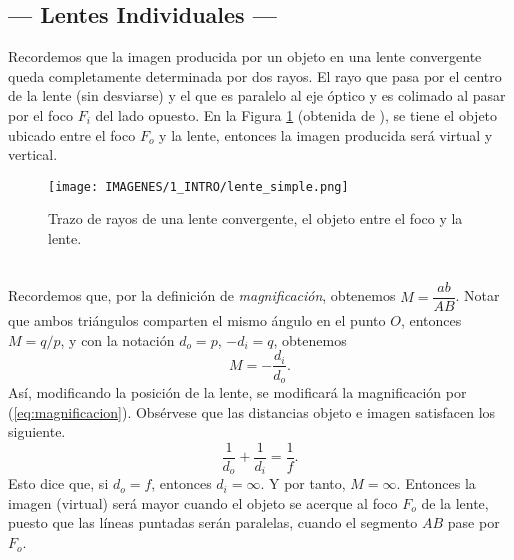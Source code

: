 \documentclass[10pt,a4paper]{article}
\begin{document}
\subsection{--- Lentes Individuales ---} %
\label{sub:lentes_individuales}
Recordemos que la imagen producida por un objeto en una lente convergente queda completamente determinada por dos rayos.
El rayo que pasa por el centro de la lente (sin desviarse) y el que es paralelo al eje óptico y es colimado al pasar por el foco \(F_i\) del lado opuesto.
En la Figura \ref{fig:lente} (obtenida de ), se tiene el objeto ubicado entre el foco \(F_o\) y la lente, entonces la imagen producida será virtual y vertical.
\begin{figure}[ht]
	\centering
	\texttt{[image: IMAGENES/1\_INTRO/lente\_simple.png]}
	\caption{Trazo de rayos de una lente convergente, el objeto entre el foco y la lente.}
	\label{fig:lente}
\end{figure}\\
Recordemos que, por la definición de \textit{magnificación}, obtenemos \(M = \dfrac{ab}{AB}\).
Notar que ambos triángulos comparten el mismo ángulo en el punto \(O\), entonces \(M=q/p\), y con la notación \(d_o=p\), \(-d_i=q\), obtenemos
\begin{equation}
	M = -\dfrac{d_i}{d_o}.
	\label{eq:magnificacion}
\end{equation}
Así, modificando la posición de la lente, se modificará la magnificación por (\ref{eq:magnificacion}).
Obsérvese que las distancias objeto e imagen satisfacen los siguiente.
\begin{equation}
	\dfrac{1}{d_o} + \dfrac{1}{d_i} = \dfrac{1}{f}.
	\label{eq:ley_lentes}
\end{equation}
Esto dice que, si \(d_o=f\), entonces \(d_i= \infty\). Y por tanto, \(M= \infty\).
Entonces la imagen (virtual) será mayor cuando el objeto se acerque al foco \(F_o\) de la lente, puesto que las líneas puntadas serán paralelas, cuando el segmento \(AB\) pase por \(F_o\).
\end{document}
